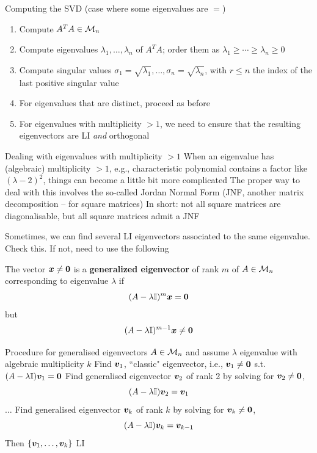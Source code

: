 \documentclass[aspectratio=169]{beamer}\usepackage[]{graphicx}\usepackage[]{xcolor}
\begin{document}
\begin{frame}{Computing the SVD (case where some eigenvalues are $=$)}
\begin{enumerate}
\item Compute $A^TA\in\mathcal{M}_n$
\item Compute eigenvalues $\lambda_1,\ldots,\lambda_n$ of $A^TA$; order them as $\lambda_1\geq\cdots\geq\lambda_n\geq 0$
\item Compute singular values $\sigma_1=\sqrt{\lambda_1},\ldots,\sigma_n=\sqrt{\lambda_n}$, with $r\leq n$ the index of the last positive singular value
\item For eigenvalues that are distinct, proceed as before
\item For eigenvalues with multiplicity $>1$, we need to ensure that the resulting eigenvectors are LI \emph{and} orthogonal
\end{enumerate}
\end{frame}

\begin{frame}{Dealing with eigenvalues with multiplicity $>1$}
When an eigenvalue has (algebraic) multiplicity $>1$, e.g., characteristic polynomial contains a factor like $(\lambda-2)^2$, things can become a little bit more complicated
\vfill
The proper way to deal with this involves the so-called Jordan Normal Form (JNF, another matrix decomposition -- for square matrices)
\vfill
In short: not all square matrices are diagonalisable, but all square matrices admit a JNF
\end{frame}


\begin{frame}
Sometimes, we can find several LI eigenvectors associated to the same eigenvalue. Check this. If not, need to use the following
\vfill
\begin{definition}
The vector $\bx\neq\b0$ is a \textbf{generalized eigenvector} of rank $m$ of $A\in\mathcal{M}_n$ corresponding to eigenvalue $\lambda$ if
\[
(A-\lambda\II)^{m}\bx = \b0
\]
but
\[
(A-\lambda\II)^{m-1}\bx\neq \b0
\]
\end{definition}
\end{frame}


\begin{frame}{Procedure for generalised eigenvectors}
$A\in\mathcal{M}_n$ and assume $\lambda$ eigenvalue with algebraic multiplicity $k$
\vfill
Find $\bm{v}_1$, ``classic" eigenvector, i.e., $\bv_1\neq\b0$ s.t. $(A-\lambda\II)\bv_1=\b0$
\vfill
Find generalised eigenvector $\bm{v}_2$ of rank 2 by solving for $\bv_2\neq\b0$,
\[
(A-\lambda\mathbb{I})\bm{v}_2 = \bm{v}_1
\]
$\ldots$
\vfill
Find generalised eigenvector $\bm{v}_k$ of rank $k$ by solving for $\bv_k\neq\b0$,
\[
(A-\lambda\mathbb{I})\bm{v}_k = \bm{v}_{k-1}
\]
\vfill
Then $\{\bm{v}_1,\ldots,\bm{v}_k\}$ LI
\end{frame}
\end{document}

